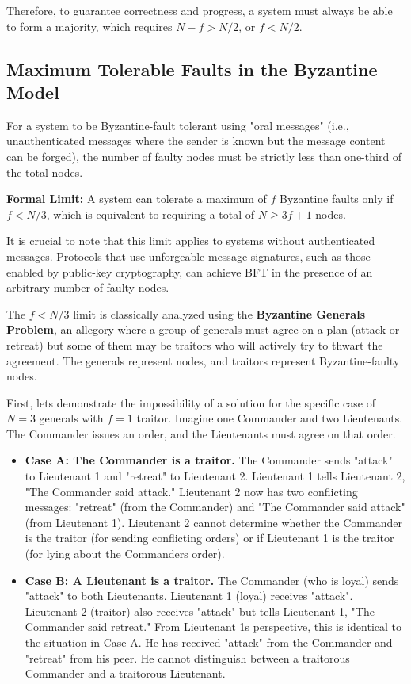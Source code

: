 \documentclass{scrbook}
\begin{document}
Therefore, to guarantee correctness and progress, a system must always
be able to form a majority, which requires
$N - f > N/2$, or $f < N/2$.

\subsection{Maximum Tolerable Faults in the Byzantine Model}

For a system to be Byzantine-fault tolerant using "oral messages" (i.e.,
unauthenticated messages where the sender is known but the message
content can be forged), the number of faulty nodes must be strictly less
than one-third of the total nodes.

\textbf{Formal Limit:} A system can tolerate a maximum of $f$ Byzantine faults only if $f < N/3$, which is equivalent to requiring a total of $N \geq 3f + 1$ nodes.

It is crucial to note that this limit applies to systems without authenticated messages. Protocols that use unforgeable message signatures, such as those enabled by public-key cryptography, can
achieve BFT in the presence of an arbitrary number of faulty nodes.

The $f < N/3$ limit is classically analyzed using the \textbf{Byzantine Generals Problem}, an allegory where a group of generals must agree on a plan (attack or retreat) but some of them may
be traitors who will actively try to thwart the agreement. The generals represent nodes, and traitors represent Byzantine-faulty nodes.

First, let\textquotesingle s demonstrate the impossibility of a solution
for the specific case of $N=3$ generals with $f=1$
traitor. Imagine one Commander and two Lieutenants. The Commander issues an order, and the Lieutenants must agree on that order.

\begin{itemize}
\item
  \textbf{Case A: The Commander is a traitor.} The Commander sends
  "attack" to Lieutenant 1 and "retreat" to Lieutenant 2. Lieutenant 1
  tells Lieutenant 2, "The Commander said attack." Lieutenant 2 now has
  two conflicting messages: "retreat" (from the Commander) and "The
  Commander said attack" (from Lieutenant 1). Lieutenant 2 cannot
  determine whether the Commander is the traitor (for sending
  conflicting orders) or if Lieutenant 1 is the traitor (for lying about
  the Commander\textquotesingle s order).
\item
  \textbf{Case B: A Lieutenant is a traitor.} The Commander (who is
  loyal) sends "attack" to both Lieutenants. Lieutenant 1 (loyal)
  receives "attack". Lieutenant 2 (traitor) also receives "attack" but
  tells Lieutenant 1, "The Commander said retreat." From Lieutenant
  1\textquotesingle s perspective, this is identical to the situation in
  Case A. He has received "attack" from the Commander and "retreat" from
  his peer. He cannot distinguish between a traitorous Commander and a
  traitorous Lieutenant.
\end{itemize}
\end{document}
